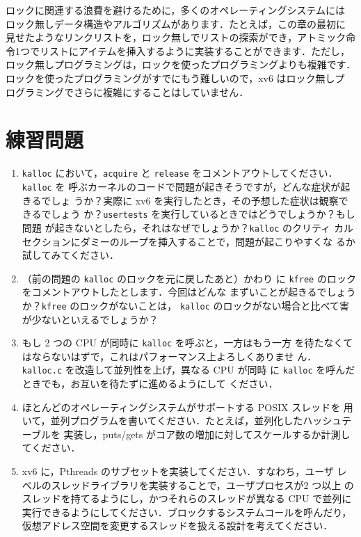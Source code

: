ロックに関連する浪費を避けるために，多くのオペレーティングシステムには
ロック無しデータ構造やアルゴリズムがあります．たとえば，この章の最初に
見せたようなリンクリストを，ロック無しでリストの探索ができ，アトミック命
令1つでリストにアイテムを挿入するように実装することができます．ただし，
ロック無しプログラミングは，ロックを使ったプログラミングよりも複雑です．
ロックを使ったプログラミングがすでにもう難しいので，xv6 はロック無しプ
ログラミングでさらに複雑にすることはしていません．

\section{練習問題}

\begin{enumerate}
  
\item \lstinline{kalloc} 
において，\lstinline{acquire}
  と \lstinline{release} をコメントアウトしてください．\lstinline{kalloc} を
  呼ぶカーネルのコードで問題が起きそうですが，どんな症状が起きるでしょ
  うか？実際に xv6 を実行したとき，その予想した症状は観察できるでしょう
  か？\lstinline{usertests} を実行しているときではどうでしょうか？もし問題
  が起きないとしたら，それはなぜでしょうか？\lstinline{kalloc} のクリティ
  カルセクションにダミーのループを挿入することで，問題が起こりやすくな
  るか試してみてください．

\item （前の問題の \lstinline{kalloc} のロックを元に戻したあと）かわり
  に \lstinline{kfree} のロックをコメントアウトしたとします．今回はどんな
  まずいことが起きるでしょうか？\lstinline{kfree} のロックがないことは，
  \lstinline{kalloc} のロックがない場合と比べて害が少ないといえるでしょうか？

\item もし 2 つの CPU が同時に \lstinline{kalloc} を呼ぶと，一方はもう一方
  を待たなくてはならないはずで，これはパフォーマンス上よろしくありませ
  ん．\lstinline{kalloc.c} を改造して並列性を上げ，異なる CPU が同時
  に \lstinline{kalloc} を呼んだときでも，お互いを待たずに進めるようにして
  ください．

\item ほとんどのオペレーティングシステムがサポートする POSIX スレッドを
  用いて，並列プログラムを書いてください．たとえば，並列化したハッシュテーブルを
  実装し，puts/gets がコア数の増加に対してスケールするか計測してください．

\item xv6 に，Pthreads のサブセットを実装してください．すなわち，ユーザ
  レベルのスレッドライブラリを実装することで，ユーザプロセスが2 つ以上
  のスレッドを持てるようにし，かつそれらのスレッドが異なる CPU で並列に
  実行できるようにしてください．ブロックするシステムコールを呼んだり，
  仮想アドレス空間を変更するスレッドを扱える設計を考えてください．
\end{enumerate}


